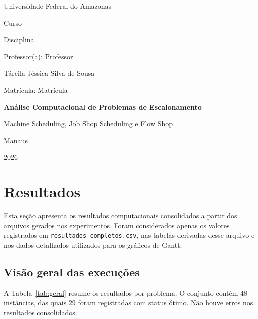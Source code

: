 \documentclass[12pt,a4paper]{article}
\newcommand{\universidade}{Universidade Federal do Amazonas}
\newcommand{\curso}{Curso}
\newcommand{\disciplina}{Disciplina}
\newcommand{\professor}{Professor}
\newcommand{\autora}{Tárcila Jéssica Silva de Sousa}
\newcommand{\matricula}{Matrícula}
\newcommand{\titulo}{Análise Computacional de Problemas de Escalonamento}
\newcommand{\subtitulo}{Machine Scheduling, Job Shop Scheduling e Flow Shop}
\newcommand{\localidade}{Manaus}
\newcommand{\ano}{2026}
\begin{document}
\begin{titlepage}
  \centering
  {\large \universidade\par}
  \vspace{0.5cm}
  {\large \curso\par}
  {\large \disciplina\par}
  \vspace{0.5cm}
  {\large Professor(a): \professor\par}

  \vfill

  {\large \autora\par}
  {\large Matrícula: \matricula\par}

  \vfill

  {\bfseries\Large \titulo\par}
  \vspace{0.4cm}
  {\large \subtitulo\par}

  \vfill

  {\large \localidade\par}
  {\large \ano\par}
\end{titlepage}


\section{Resultados}

Esta seção apresenta os resultados computacionais consolidados a partir dos
arquivos gerados nos experimentos. Foram considerados apenas os valores
registrados em \texttt{resultados\_completos.csv}, nas tabelas derivadas desse
arquivo e nos dados detalhados utilizados para os gráficos de Gantt.

\subsection{Visão geral das execuções}

A Tabela~\ref{tab:geral} resume os resultados por problema. O conjunto contém
48 instâncias, das quais 29 foram registradas com status ótimo. Não houve erros
nos resultados consolidados.
\end{document}
